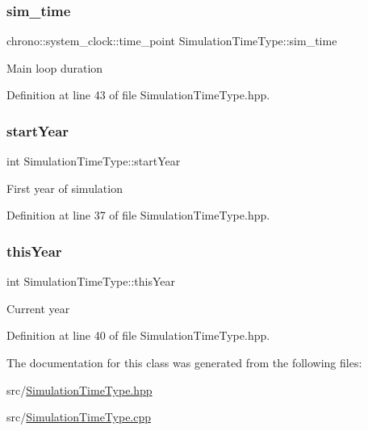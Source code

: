 \subsubsection{\texorpdfstring{sim\+\_\+time}{sim\_time}}
{\footnotesize\ttfamily chrono\+::system\+\_\+clock\+::time\+\_\+point Simulation\+Time\+Type\+::sim\+\_\+time}

Main loop duration 

Definition at line 43 of file Simulation\+Time\+Type.\+hpp.

\mbox{\label{class_simulation_time_type_aaa632d7b7d9a2373e0e0fa8fffbbe122}} 
\subsubsection{\texorpdfstring{start\+Year}{startYear}}
{\footnotesize\ttfamily int Simulation\+Time\+Type\+::start\+Year}

First year of simulation 

Definition at line 37 of file Simulation\+Time\+Type.\+hpp.

\mbox{\label{class_simulation_time_type_a1cd46f2a7b6924dec7aa98832a881c4e}} 
\subsubsection{\texorpdfstring{this\+Year}{thisYear}}
{\footnotesize\ttfamily int Simulation\+Time\+Type\+::this\+Year}

Current year 

Definition at line 40 of file Simulation\+Time\+Type.\+hpp.



The documentation for this class was generated from the following files\+:\begin{DoxyCompactItemize}
\item 
src/\mbox{\hyperlink{_simulation_time_type_8hpp}{Simulation\+Time\+Type.\+hpp}}\item 
src/\mbox{\hyperlink{_simulation_time_type_8cpp}{Simulation\+Time\+Type.\+cpp}}\end{DoxyCompactItemize}
